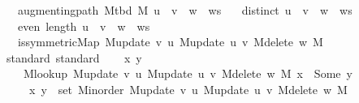 \begin{isabellebody}
\ \ \ {\isachardoublequoteopen}augmenting{\isacharunderscore}{\kern0pt}path\ {\isacharparenleft}{\kern0pt}M{\isacharunderscore}{\kern0pt}tbd\ M{\isacharparenright}{\kern0pt}\ {\isacharparenleft}{\kern0pt}u\ {\isacharhash}{\kern0pt}\ v\ {\isacharhash}{\kern0pt}\ w\ {\isacharhash}{\kern0pt}\ ws{\isacharparenright}{\kern0pt}{\isachardoublequoteclose}\isanewline
\ \ \ {\isachardoublequoteopen}distinct\ {\isacharparenleft}{\kern0pt}u\ {\isacharhash}{\kern0pt}\ v\ {\isacharhash}{\kern0pt}\ w\ {\isacharhash}{\kern0pt}\ ws{\isacharparenright}{\kern0pt}{\isachardoublequoteclose}\isanewline
\ \ \ {\isachardoublequoteopen}even\ {\isacharparenleft}{\kern0pt}length\ {\isacharparenleft}{\kern0pt}u\ {\isacharhash}{\kern0pt}\ v\ {\isacharhash}{\kern0pt}\ w\ {\isacharhash}{\kern0pt}\ ws{\isacharparenright}{\kern0pt}{\isacharparenright}{\kern0pt}{\isachardoublequoteclose}\isanewline
\ \ \ {\isachardoublequoteopen}is{\isacharunderscore}{\kern0pt}symmetric{\isacharunderscore}{\kern0pt}Map\ {\isacharparenleft}{\kern0pt}M{\isacharunderscore}{\kern0pt}update\ v\ u\ {\isacharparenleft}{\kern0pt}M{\isacharunderscore}{\kern0pt}update\ u\ v\ {\isacharparenleft}{\kern0pt}M{\isacharunderscore}{\kern0pt}delete\ w\ M{\isacharparenright}{\kern0pt}{\isacharparenright}{\kern0pt}{\isacharparenright}{\kern0pt}{\isachardoublequoteclose}%
\endisataginvisible
{\isafoldinvisible}%
%
\isadeliminvisible
\isanewline
%
\endisadeliminvisible
%
\isadelimproof
%
\endisadelimproof
%
\isatagproof
{}\isamarkupfalse%
\ {\isacharparenleft}{\kern0pt}standard{\isacharcomma}{\kern0pt}\ standard{\isacharparenright}{\kern0pt}\isanewline
\ \ \isamarkupfalse%
\ x\ y\isanewline
\ \ \isamarkupfalse%
\isanewline
\ \ \ \ {\isachardoublequoteopen}M{\isacharunderscore}{\kern0pt}lookup\ {\isacharparenleft}{\kern0pt}M{\isacharunderscore}{\kern0pt}update\ v\ u\ {\isacharparenleft}{\kern0pt}M{\isacharunderscore}{\kern0pt}update\ u\ v\ {\isacharparenleft}{\kern0pt}M{\isacharunderscore}{\kern0pt}delete\ w\ M{\isacharparenright}{\kern0pt}{\isacharparenright}{\kern0pt}{\isacharparenright}{\kern0pt}\ x\ {\isacharequal}{\kern0pt}\ Some\ y\ {\isasymlongleftrightarrow}\isanewline
\ \ \ \ \ {\isacharparenleft}{\kern0pt}x{\isacharcomma}{\kern0pt}\ y{\isacharparenright}{\kern0pt}\ {\isasymin}\ set\ {\isacharparenleft}{\kern0pt}M{\isacharunderscore}{\kern0pt}inorder\ {\isacharparenleft}{\kern0pt}M{\isacharunderscore}{\kern0pt}update\ v\ u\ {\isacharparenleft}{\kern0pt}M{\isacharunderscore}{\kern0pt}update\ u\ v\ {\isacharparenleft}{\kern0pt}M{\isacharunderscore}{\kern0pt}delete\ w\ M{\isacharparenright}{\kern0pt}{\isacharparenright}{\kern0pt}{\isacharparenright}{\kern0pt}{\isacharparenright}{\kern0pt}{\isachardoublequoteclose}\isanewline

\end{isabellebody}
